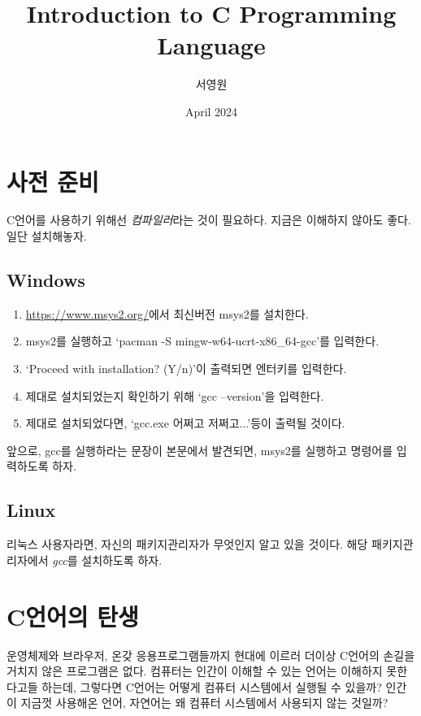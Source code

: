 \documentclass{article}
\title{Introduction to C Programming Language}
\author{서영원}
\date{April 2024}
\begin{document}
\maketitle

\tableofcontents

\vfill
\doclicenseThis


\pagebreak

\section{사전 준비}

C언어를 사용하기 위해선 \textit{컴파일러}라는 것이 필요하다.
지금은 이해하지 않아도 좋다. 일단 설치해놓자.

\subsection{Windows}

\begin{enumerate}
    \item \url{https://www.msys2.org/}에서 최신버전 msys2를 설치한다.
    \item msys2를 실행하고 `pacman -S mingw-w64-ucrt-x86\_64-gcc'를 입력한다.
    \item `Proceed with installation? (Y/n)'이 출력되면 엔터키를 입력한다.
    \item 제대로 설치되었는지 확인하기 위해 `gcc --version'을 입력한다.
    \item 제대로 설치되었다면, `gcc.exe 어쩌고 저쩌고...'등이 출력될 것이다.
\end{enumerate}

앞으로, gcc를 실행하라는 문장이 본문에서 발견되면, msys2를 실행하고 명령어를 입력하도록 하자.

\subsection{Linux}

리눅스 사용자라면, 자신의 패키지관리자가 무엇인지 알고 있을 것이다.
해당 패키지관리자에서 \textit{gcc}를 설치하도록 하자.

\section{C언어의 탄생}

운영체제와 브라우저, 온갖 응용프로그램들까지 현대에 이르러 더이상
C언어의 손길을 거치지 않은 프로그램은 없다.
컴퓨터는 인간이 이해할 수 있는 언어는 이해하지 못한다고들 하는데,
그렇다면 C언어는 어떻게 컴퓨터 시스템에서 실행될 수 있을까?
인간이 지금껏 사용해온 언어, 자연어는 왜 컴퓨터 시스템에서 사용되지 않는
것일까?
\end{document}
